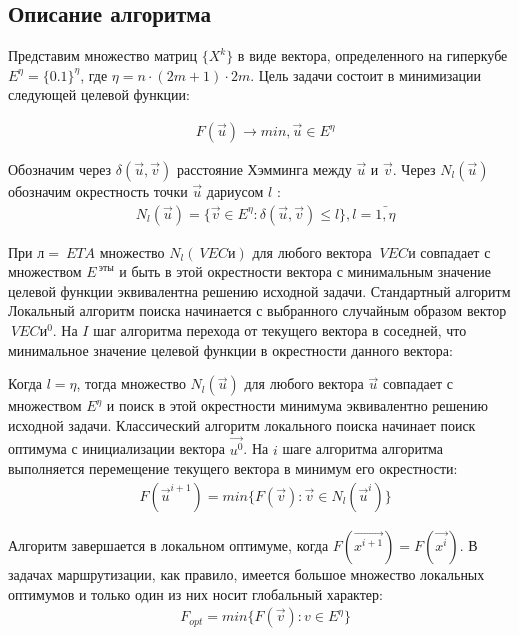 \documentclass[]{TAACpaper}
\begin{document}
\subsection{Описание алгоритма}
Представим множество матриц $\{X^k\}$ в виде вектора, определенного на гиперкубе $E^\eta=\{0.1\}^\eta$, где $\eta=n\cdot(2m+1)\cdot 2m$. Цель задачи состоит в минимизации следующей целевой функции:
		
\begin{align} 
& F(\vec{u})\to min,\vec{u}\in E^{\eta}
\end{align}	

Обозначим через $\delta(\vec{u},\vec{v})$ расстояние Хэмминга между $\vec{u}$ и $\vec{v}$. Через $N_l(\vec{u})$ обозначим окрестность точки $\vec{u}$ дариусом $l$ \cite{vrp_shafeyev}:
\begin{align} 
& N_l(\vec{u})=\{\vec{v} \in E^{\eta}:\delta(\vec{u},\vec{v})\le l \}, l=\bar{1,\eta}
\end{align}	


При $ л = \ ETA $ множество $ N_l (\ VEC {и}) $ для любого вектора $ \ VEC {и} $ совпадает с множеством $ E ^ {\ эты} $ и быть в этой окрестности вектора с минимальным значение целевой функции эквивалентна решению исходной задачи. Стандартный алгоритм Локальный алгоритм поиска начинается с выбранного случайным образом вектор $ \ VEC {и ^ 0} $.
На $ I $ шаг алгоритма перехода от текущего вектора в соседней, что минимальное значение целевой функции в окрестности данного вектора:

Когда $l=\eta$, тогда множество $ N_l(\vec{u})$ для любого вектора $\vec{u}$ совпадает с множеством $E^{\eta}$  и поиск в этой окрестности минимума эквивалентно решению исходной задачи. Классический алгоритм локального поиска начинает поиск оптимума с  инициализации вектора $\vec{u^0}$.
На $i$ шаге алгоритма  алгоритма выполняется перемещение текущего вектора в минимум его окрестности:
\begin{align} 
& F(\vec{u}^{i+1})=min\{F(\vec{v}):\vec{v} \in N_l(\vec{u}^i)\}
\end{align}	

Алгоритм завершается в локальном оптимуме, когда $F(\vec{x^{i+1}})=F(\vec{x^i})$. В задачах маршрутизации, как правило, имеется большое множество локальных оптимумов и только один из них носит глобальный характер:
\begin{align} 
& F_{opt}=min\{F(\vec{v}):v \in E^{\eta}\}
\end{align}	
\end{document}
